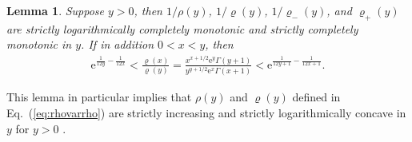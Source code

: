 \documentclass[aop]{imsart}
\theoremstyle{plain}
\newtheorem{lemma}[theorem]{Lemma}
\theoremstyle{remark}
\newcommand{\rme}{\mathrm{e}}
\newcommand{\1}{\operatorname{\uppercase\expandafter{\romannumeral1}}}
\newcommand{\2}{\operatorname{\uppercase\expandafter{\romannumeral2}}}
\newcommand{\3}{\operatorname{\uppercase\expandafter{\romannumeral3}}}
\newcommand{\4}{\operatorname{\uppercase\expandafter{\romannumeral4}}}
\newcommand{\5}{\operatorname{\uppercase\expandafter{\romannumeral5}}}
\newcommand{\6}{\operatorname{\uppercase\expandafter{\romannumeral6}}}
\newcommand{\7}{\operatorname{\uppercase\expandafter{\romannumeral7}}}
\newcommand{\8}{\operatorname{\uppercase\expandafter{\romannumeral8}}}
\newcommand{\9}{\operatorname{\uppercase\expandafter{\romannumeral9}}}
\newcommand{\eref}[1]{Eq.~\textup{(\ref{#1})}}
\begin{document}
\begin{lemma}\label{lem:SCMrho}
	Suppose $y>0$, then $1/\rho(y)$, $1/\varrho(y)$, $1/\varrho_-(y)$, and $\varrho_+(y)$	are strictly logarithmically completely monotonic and strictly completely monotonic in $y$. If in addition $0<x<y$, then 
	\begin{align}
	\rme^{\frac{1}{12y}-\frac{1}{12x}}< \frac{\varrho(x)}{\varrho(y)}=\frac{x^{x+1/2}\rme^y\Gamma(y+1)}{y^{y+1/2}\rme^x\Gamma(x+1)}< \rme^{\frac{1}{12y+1}-\frac{1}{12x+1}}. \label{eq:varrhokn}
	\end{align}
\end{lemma}
This lemma in particular implies that
$\rho(y)$ and  $\varrho(y)$ defined in \eref{eq:rhovarrho} are strictly increasing and strictly logarithmically concave  in $y$ for $y>0$ \cite{Guo06}.
\end{document}
